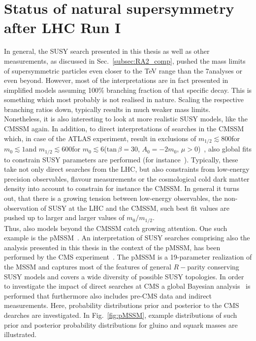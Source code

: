 \section{Status of natural supersymmetry after LHC Run I}
\label{sec:susy_status}
In general, the SUSY search presented in this thesis as well as other measurements, as discussed in Sec.~\ref{subsec:RA2_comp}, pushed the mass limits of supersymmetric particles even closer to the TeV range than the 7\tev analyses or even beyond. However, most of the interpretations are in fact presented in simplified models assuming 100\% branching fraction of that specific decay. This is something which most probably is not realised in nature. Scaling the respective branching ratios down, typically results in much weaker mass limits. \\
Nonetheless, it is also interesting to look at more realistic SUSY models, like \eg the CMSSM again. In addition, to direct interpretations of searches in the CMSSM which, \eg in case of the ATLAS experiment, result in exclusions of $m_{1/2} \lesssim 800$\gev for $m_{0} \lesssim 1$\tev and $m_{1/2} \lesssim 600$\gev for $m_{0} \lesssim 6$\tev ($\mathrm{tan} \, \beta = 30$, $A_0 = -2m_0$, $\mu >0$)~\cite{bib:ATLAS:PhysicsResultsSUS}, also global fits to constrain SUSY parameters are performed (\cf for instance~\cite{Bechtle:2012zk, Buchmueller:2013rsa}). Typically, these take not only direct searches from the LHC, but also constraints from low-energy precision observables, flavour measurements or the cosmological cold dark matter density into account to constrain for instance the CMSSM. In general it turns out, that there is a growing tension between low-energy observables, the non-observation of SUSY at the LHC and the CMSSM, such best fit values are pushed up to larger and larger values of $m_0/m_{1/2}$. \\
Thus, also models beyond the CMSSM catch growing attention. One such example is the pMSSM~\cite{Djouadi:1998di}. An interpretation of SUSY searches comprising also the analysis presented in this thesis in the context of the pMSSM, has been performed by the CMS experiment~\cite{CMS-PAS-SUS-13-020}. The pMSSM is a 19-parameter realization of the MSSM and captures most of the features of general $R-$parity conserving SUSY models and covers a wide diversity of possible SUSY topologies. In order to investigate the impact of direct searches at CMS a global Bayesian analysis~\cite{robert2001bayesian, o2004bayesian} is performed that furthermore also includes pre-CMS data and indirect measurements. Here, probability distributions prior and posterior to the CMS dearches are investigated. In Fig.~\ref{fig:pMSSM}, example distributions of such prior and posterior probability distributions for gluino and squark masses are illustrated.
